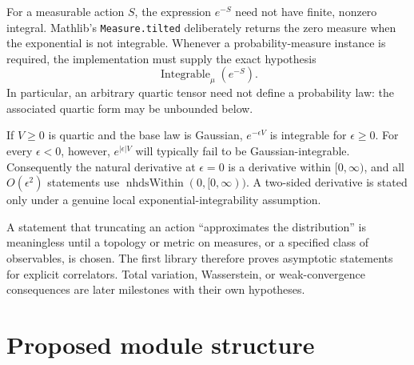 \begin{remark}
For a measurable action $S$, the expression $e^{-S}$ need not have finite, nonzero integral.
Mathlib's \texttt{Measure.tilted} deliberately returns the zero measure when the exponential is not
integrable.  Whenever a probability-measure instance is required, the implementation must supply
the exact hypothesis
\[
  \operatorname{Integrable}_{\mu}(e^{-S}).
\]
In particular, an arbitrary quartic tensor need not define a probability law: the associated
quartic form may be unbounded below.
\end{remark}

\begin{remark}
If $V\geq 0$ is quartic and the base law is Gaussian, $e^{-\epsilon V}$ is integrable for
$\epsilon\geq0$.  For every $\epsilon<0$, however, $e^{|\epsilon|V}$ will typically fail to be
Gaussian-integrable.  Consequently the natural derivative at $\epsilon=0$ is a derivative within
$[0,\infty)$, and all $O(\epsilon^2)$ statements use
$\operatorname{nhdsWithin}(0,[0,\infty))$.  A two-sided derivative is stated only under a genuine
local exponential-integrability assumption.
\end{remark}

\begin{remark}
A statement that truncating an action ``approximates the distribution'' is meaningless until a
topology or metric on measures, or a specified class of observables, is chosen.  The first library
therefore proves asymptotic statements for explicit correlators.  Total variation, Wasserstein,
or weak-convergence consequences are later milestones with their own hypotheses.
\end{remark}

\section{Proposed module structure}

